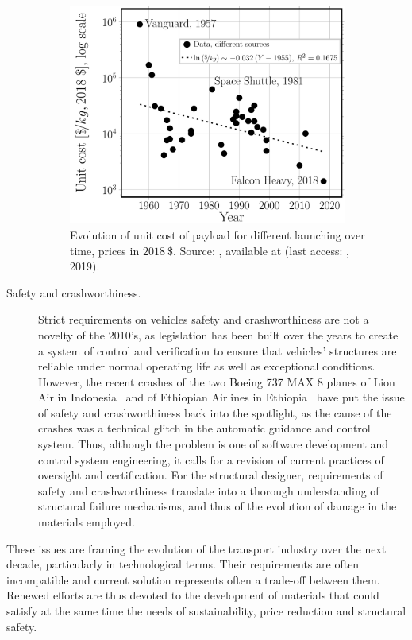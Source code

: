 \begin{description}
\begin{figure}[!h]
\includegraphics[width=0.9\textwidth]{pics/spacetravelcost.pdf}
\caption{Evolution of unit cost of payload for different launching over time, prices in $2018\ \$$. Source: , available at \href{}{} (last access: , 2019).}\label{chap1:fig:spacetravelcost}
\end{figure}

\item[Safety and crashworthiness.] Strict requirements on vehicles safety and crashworthiness are not a novelty of the 2010's, as legislation has been built over the years to create a system of control and verification to ensure that vehicles' structures are reliable under normal operating life as well as exceptional conditions. However, the recent crashes of the two Boeing 737 MAX 8 planes of Lion Air in Indonesia~\cite{aviationSafety2018} and of Ethiopian Airlines in Ethiopia~\cite{aviationSafety2019} have put the issue of safety and crashworthiness back into the spotlight, as the cause of the crashes was a technical glitch in the automatic guidance and control system. Thus, although the problem is one of software development and control system engineering, it calls for a revision of current practices of oversight and certification. For the structural designer, requirements of safety and crashworthiness translate into a thorough understanding of structural failure mechanisms, and thus of the evolution of damage in the materials employed.

\end{description}

These issues are framing the evolution of the transport industry over the next decade, particularly in technological terms. Their requirements are often incompatible and current solution represents often a trade-off between them. Renewed efforts are thus devoted to the development of materials that could satisfy at the same time the needs of sustainability, price reduction and structural safety.

